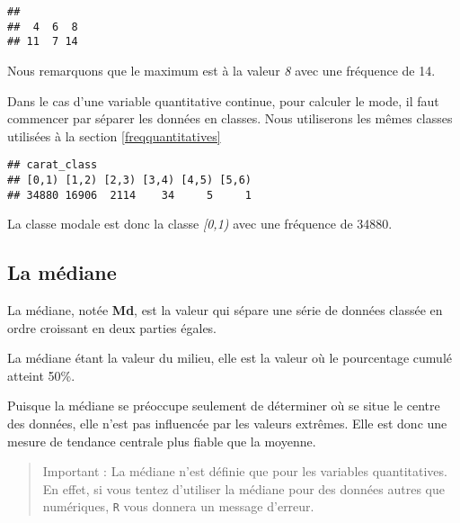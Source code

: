 \documentclass[]{book}
\newenvironment{Shaded}{\begin{snugshade}}{\end{snugshade}}
\newcommand{\KeywordTok}[1]{\textcolor[rgb]{0.13,0.29,0.53}{\textbf{#1}}}
\newcommand{\DataTypeTok}[1]{\textcolor[rgb]{0.13,0.29,0.53}{#1}}
\newcommand{\DecValTok}[1]{\textcolor[rgb]{0.00,0.00,0.81}{#1}}
\newcommand{\StringTok}[1]{\textcolor[rgb]{0.31,0.60,0.02}{#1}}
\newcommand{\OtherTok}[1]{\textcolor[rgb]{0.56,0.35,0.01}{#1}}
\newcommand{\OperatorTok}[1]{\textcolor[rgb]{0.81,0.36,0.00}{\textbf{#1}}}
\newcommand{\NormalTok}[1]{#1}
\begin{document}
\begin{verbatim}
## 
##  4  6  8 
## 11  7 14
\end{verbatim}

Nous remarquons que le maximum est à la valeur \emph{8} avec une
fréquence de 14.

Dans le cas d'une variable quantitative continue, pour calculer le mode,
il faut commencer par séparer les données en classes. Nous utiliserons
les mêmes classes utilisées à la section \ref{freqquantitatives}

\begin{Shaded}
\end{Shaded}

\begin{verbatim}
## carat_class
## [0,1) [1,2) [2,3) [3,4) [4,5) [5,6) 
## 34880 16906  2114    34     5     1
\end{verbatim}

La classe modale est donc la classe \emph{{[}0,1)} avec une fréquence de
34880.

\subsection{La médiane}\label{la-mediane}

La médiane, notée \textbf{Md}, est la valeur qui sépare une série de
données classée en ordre croissant en deux parties égales.

La médiane étant la valeur du milieu, elle est la valeur où le
pourcentage cumulé atteint 50\%.

Puisque la médiane se préoccupe seulement de déterminer où se situe le
centre des données, elle n'est pas influencée par les valeurs extrêmes.
Elle est donc une mesure de tendance centrale plus fiable que la
moyenne.

\begin{quote}
Important : La médiane n'est définie que pour les variables
quantitatives. En effet, si vous tentez d'utiliser la médiane pour des
données autres que numériques, \texttt{R} vous donnera un message
d'erreur.
\end{quote}
\end{document}
